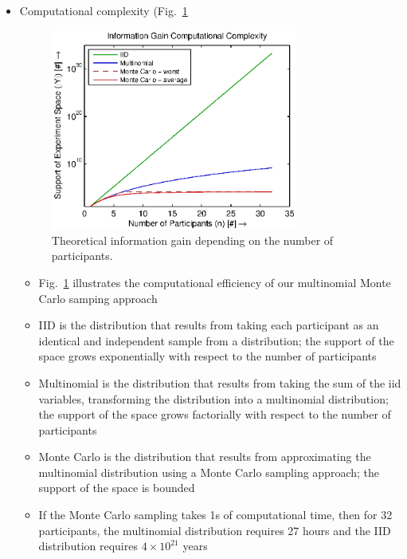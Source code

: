 \documentclass[11pt]{article}
\begin{document}
\begin{itemize}
\begin{itemize}
                \item Computational complexity (Fig.~\ref{fig:comp}
\begin{figure}[h!]
\centering
\includegraphics[width=3.2in]{img/comp.eps}
\caption{Theoretical information gain depending on the number of participants.}
\label{fig:comp}
\end{figure}
                    \begin{itemize}
                        \item Fig.~\ref{fig:comp} illustrates the computational efficiency of our multinomial Monte Carlo samping approach
                        \item IID is the distribution that results from taking each participant as an identical and independent sample from a distribution; the support of the space grows exponentially with respect to the number of participants
                        \item Multinomial is the distribution that results from taking the sum of the iid variables, transforming the distribution into a multinomial distribution; the support of the space grows factorially with respect to the number of participants
                        \item Monte Carlo is the distribution that results from approximating the multinomial distribution using a Monte Carlo sampling approach; the support of the space is bounded 
                        \item If the Monte Carlo sampling takes 1s of computational time, then for 32 participants, the multinomial distribution requires 27 hours and the IID distribution requires $4\times10^{21}$ years
                    \end{itemize}
            \end{itemize}
    \end{itemize}
\end{document}
